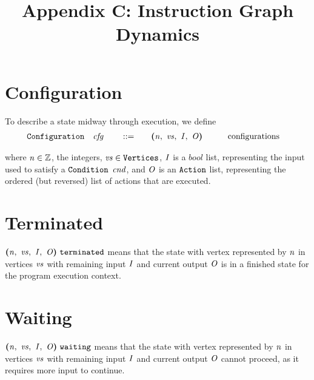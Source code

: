 \documentclass[12pt]{article}
\title{Appendix C: Instruction Graph Dynamics}
\author{}
\date{}
\begin{document}
\maketitle

\thispagestyle{simple}
\section{Configuration}

To describe a state midway through execution, we define
\begin{alignat*}{4}
  \sort{Configuration}\quad
    &\nterm{cfg}\quad & &::=\quad &
      &\cfg{\nterm{n}}{\nterm{vs}}{\nterm{I}}{\nterm{O}}\qquad &
        &\text{configurations}
\end{alignat*}

where $\nterm{n} \in \mathbb{Z}$, the integers, $\nterm{vs} \in
\sort{Vertices}$, $\nterm{I}$ is a $bool$ list, representing the input used to
satisfy a $\sort{Condition}$ $\nterm{cnd}$, and $\nterm{O}$ is an
$\sort{Action}$ list, representing the ordered (but reversed) list of actions
that are executed.\\

\section{Terminated}

$\terminated{\cfg{\nterm{n}}{\nterm{vs}}{\nterm{I}}{\nterm{O}}}$ means that the
state with vertex represented by $\nterm{n}$ in vertices $\nterm{vs}$ with
remaining input $\nterm{I}$ and current output $\nterm{O}$ is in a finished
state for the program execution context.

\begin{mathpar}
   
\end{mathpar}

\section{Waiting}

$\waiting{\cfg{\nterm{n}}{\nterm{vs}}{\nterm{I}}{\nterm{O}}}$ means that the
state with vertex represented by $\nterm{n}$ in vertices $\nterm{vs}$ with
remaining input $\nterm{I}$ and current output $\nterm{O}$ cannot proceed, as it
requires more input to continue.

\begin{mathpar}
   

   
\end{mathpar}
\end{document}
